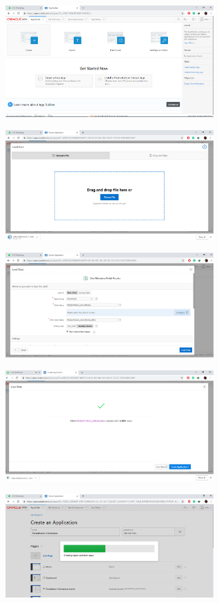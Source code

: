 \begin{figure}[H]
	\centering
	\includegraphics[width=8cm]{figures/4.png}
\end{figure}

\begin{figure}[H]
	\centering
	\includegraphics[width=8cm]{figures/5.png}
\end{figure}

\begin{figure}[H]
	\centering
	\includegraphics[width=8cm]{figures/6.png}
\end{figure}

\begin{figure}[H]
	\centering
	\includegraphics[width=8cm]{figures/7.png}
\end{figure}

\begin{figure}[H]
	\centering
	\includegraphics[width=8cm]{figures/8.png}
\end{figure}

